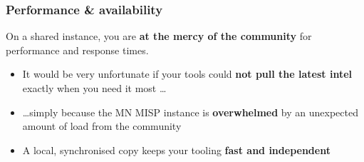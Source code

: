 \begin{frame}
    \frametitle{Performance \& availability}

    On a shared instance, you are \textbf{at the mercy of the community} for performance
    and response times.

    \vspace{0.5em}

    \begin{itemize}
        \item It would be very unfortunate if your tools could \textbf{not pull the latest
              intel} exactly when you need it most \dots
        \item \dots simply because the MN MISP instance is \textbf{overwhelmed} by an
              unexpected amount of load from the community
        \item A local, synchronised copy keeps your tooling \textbf{fast and independent}
    \end{itemize}

    \vspace{0.5em}

\end{frame}


